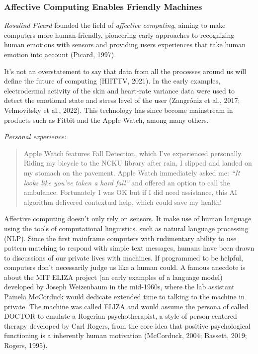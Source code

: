 \documentclass[
  letterpaper,
  DIV=11,
  numbers=noendperiod]{scrartcl}
\begin{document}
\subsubsection{Affective Computing Enables Friendly
Machines}\label{affective-computing-enables-friendly-machines}

\emph{Rosalind Picard} founded the field of \emph{affective computing},
aiming to make computers more human-friendly, pioneering early
approaches to recognizing human emotions with sensors and providing
users experiences that take human emotion into account (Picard, 1997).

It's not an overstatement to say that data from all the processes around
us will define the future of computing (HIITTV, 2021). In the early
examples, electrodermal activity of the skin and heart-rate variance
data were used to detect the emotional state and stress level of the
user (Zangróniz et al., 2017; Velmovitsky et al., 2022). This technology
has since become mainstream in products such as Fitbit and the Apple
Watch, among many others.

\emph{Personal experience:}

\begin{quote}
Apple Watch features Fall Detection, which I've experienced personally.
Riding my bicycle to the NCKU library after rain, I slipped and landed
on my stomach on the pavement. Apple Watch immediately asked me:
\emph{``It looks like you've taken a hard fall''} and offered an option
to call the ambulance. Fortunately I was OK but if I did need
assistance, this AI algorithm delivered contextual help, which could
save my health!
\end{quote}

Affective computing doesn't only rely on sensors. It make use of human
language using the tools of computational linguistics. such as natural
language processing (NLP). Since the first mainframe computers with
rudimentary ability to use pattern matching to respond with simple text
messages, humans have been drawn to discussions of our private lives
with machines. If programmed to be helpful, computers don't necessarily
judge us like a human could. A famous anecdote is about the MIT ELIZA
project (an early examples of a language model) developed by Joseph
Weizenbaum in the mid-1960s, where the lab assistant Pamela McCorduck
would dedicate extended time to talking to the machine in private. The
machine was called ELIZA and would assume the persona of called DOCTOR
to emulate a Rogerian psychotherapist, a style of person-centered
therapy developed by Carl Rogers, from the core idea that positive
psychological functioning is a inherently human motivation (McCorduck,
2004; Bassett, 2019; Rogers, 1995).
\end{document}
